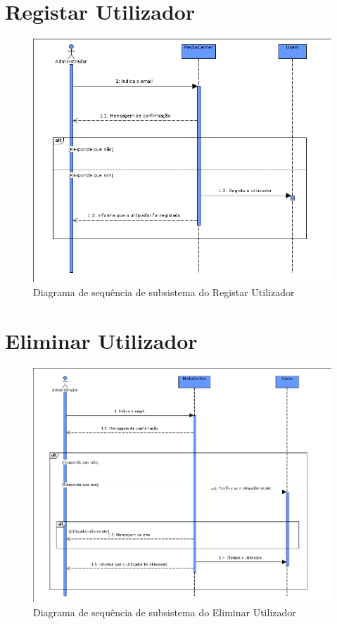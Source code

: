 \documentclass[a4paper]{report}
\begin{document}
\section{Registar Utilizador}
\begin{figure}[H]
	\centering 
    \includegraphics[width=\textwidth]{images/reguserSub.png}  
    \caption{Diagrama de sequência de subsistema do Registar Utilizador}
\end{figure}

\section{Eliminar Utilizador}
\begin{figure}[H]
	\centering 
    \includegraphics[width=\textwidth]{images/elemuserSub.png}  
    \caption{Diagrama de sequência de subsistema do Eliminar Utilizador}
\end{figure}
\end{document}
